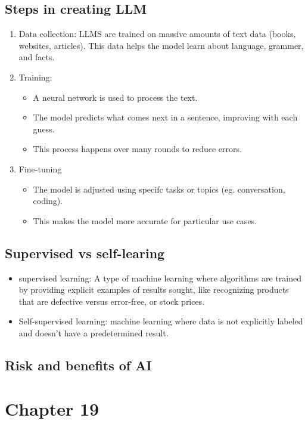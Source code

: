 \documentclass{report}
\begin{document}
\subsection{Steps in creating LLM}
\begin{enumerate}
    \item Data collection: LLMS are trained on massive amounts of text data (books, websites, articles). This data helps the model learn about language, grammer, and facts.
    \item Training:
        \begin{itemize}[label=$\circ$]
            \item A neural network is used to process the text.
            \item The model predicts what comes next in a sentence, improving with each guess.
            \item This process happens over many rounds to reduce errors.
        \end{itemize}
    \item Fine-tuning
        \begin{itemize}[label=$\circ$]
            \item The model is adjusted using specifc tasks or topics (eg. conversation, coding).
            \item This makes the model more accurate for particular use cases.
        \end{itemize}
\end{enumerate}
\subsection{Supervised vs self-learing}
\begin{itemize}
    \item supervised learning: A type of machine learning where algorithms are trained by providing explicit examples of results sought, like recognizing products that are defective versus error-free, or stock prices.
    \item Self-supervised learning: machine learning where data is not explicitly labeled and doesn't have a predetermined result.
\end{itemize}
\subsection{Risk and benefits of AI}

\section{Chapter 19}
\end{document}
